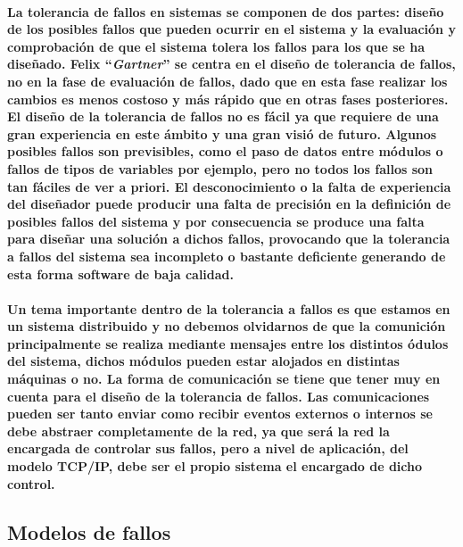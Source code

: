\documentclass{./llncs2e/llncs}
\begin{document}
\paragraph{
La tolerancia de fallos en sistemas se componen de dos partes: dise\~{n}o de los posibles fallos que pueden ocurrir en el sistema y la evaluaci\'{o}n y comprobaci\'{o}n de que el sistema tolera los fallos para los que se ha diseñado. Felix ``\textit{Gartner}'' se centra en el diseño de tolerancia de fallos, no en la fase de evaluación de fallos, dado que en esta fase  realizar los cambios es menos costoso y m\'{a}s r\'{a}pido que en otras fases posteriores. El diseño de la tolerancia de fallos no es f\'{a}cil 
ya que requiere de una gran experiencia en este \'{a}mbito y una gran visi\'{o} de futuro. Algunos posibles fallos son previsibles, como el paso de datos entre módulos o fallos de tipos de variables por ejemplo, pero no todos los fallos son tan f\'{a}ciles de ver a priori. El desconocimiento o la falta de experiencia del diseñador puede producir una falta de precisión
en la definición de posibles fallos del sistema y por consecuencia se produce una falta para diseñar una solución a dichos fallos, provocando que la tolerancia a fallos del sistema sea incompleto o bastante deficiente generando de esta forma software de baja calidad.
}

\paragraph{
Un tema importante dentro de la tolerancia a fallos es que estamos en un sistema distribuido y no debemos olvidarnos de que la comunici\'{o}n principalmente se realiza mediante mensajes entre los distintos \'{o}dulos del sistema, dichos m\'{o}dulos pueden estar alojados en distintas m\'{a}quinas o no. La forma de comunicaci\'{o}n se tiene que tener muy en cuenta
para el diseño de la tolerancia de fallos. Las comunicaciones pueden ser tanto enviar como recibir eventos externos o internos se debe abstraer completamente de la red, ya que será la red la encargada de controlar sus fallos, pero a nivel de aplicación, del modelo TCP/IP, debe ser el propio sistema el encargado de dicho control.
}

\subsection{Modelos de fallos}
\end{document}
